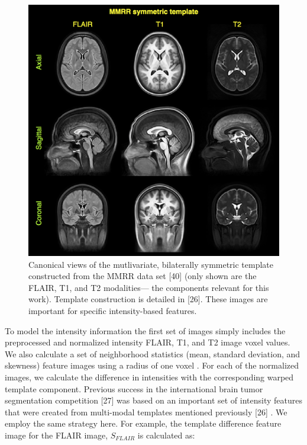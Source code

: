 \documentclass[11pt,]{article}
\begin{document}
\begin{figure}[htbp]
\centering
\includegraphics{Figures/MMRR.png}
\caption{Canonical views of the mutlivariate, bilaterally symmetric
template constructed from the MMRR data set {[}40{]} (only shown are the
FLAIR, T1, and T2 modalities--- the components relevant for this work).
Template construction is detailed in {[}26{]}. These images are
important for specific intensity-based features.}
\end{figure}

To model the intensity information the first set of images simply
includes the preprocessed and normalized intensity FLAIR, T1, and T2
image voxel values. We also calculate a set of neighborhood statistics
(mean, standard deviation, and skewness) feature images using a
 radius of one voxel
. For each of the normalized images, we calculate the
difference in intensities with the corresponding warped template
component. Previous success in the international brain tumor
segmentation competition {[}27{]} was based on an important set of
intensity features that were created from multi-modal templates
mentioned previously {[}26{]} . We
employ the same strategy here. For example, the template difference
feature image for the FLAIR image, \(S_{FLAIR}\) is calculated as:
\end{document}

